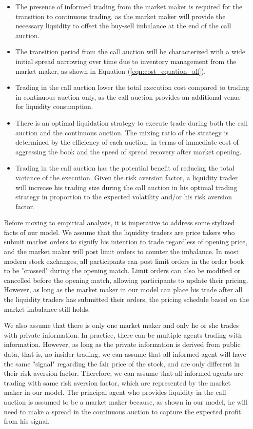 \begin{itemize}
  \item The presence of informed trading from the market maker is required for the transition to continuous trading, as the market maker will provide the necessary liquidity to offset the buy-sell imbalance at the end of the call auction.
  \item The transition period from the call auction will be characterized with a wide initial spread narrowing over time due to inventory management from the market maker, as shown in Equation (\ref{eqn:cost_equation_all}).
  \item Trading in the call auction lower the total execution cost compared to trading in continuous auction only, as the call auction provides an additional venue for liquidity consumption.
  \item There is an optimal liquidation strategy to execute trade during both the call auction and the continuous auction. The mixing ratio of the strategy is determined by the efficiency of each auction, in terms of immediate cost of aggressing the book and the speed of spread recovery after market opening.
  \item Trading in the call auction has the potential benefit of reducing the total variance of the execution. Given the risk aversion factor, a liquidity trader will increase his trading size during the call auction in his optimal trading strategy in proportion to the expected volatility and/or his risk aversion factor.
\end{itemize}

Before moving to empirical analysis, it is imperative to address some stylized facts of our model. We assume that the liquidity traders are price takers who submit market orders to signify his intention to trade regardless of opening price, and the market maker will post limit orders to counter the imbalance. In most modern stock exchanges, all participants can post limit orders in the order book to be "crossed" during the opening match. Limit orders can also be modified or cancelled before the opening match, allowing participants to update their pricing. However, as long as the market maker in our model can place his trade after all the liquidity traders has submitted their orders, the pricing schedule based on the market imbalance still holds.

We also assume that there is only one market maker and only he or she trades with private information. In practice, there can be multiple agents trading with information. However, as long as the private information is derived from public data, that is, no insider trading, we can assume that all informed agent will have the same "signal" regarding the fair price of the stock, and are only different in their risk aversion factor. Therefore, we can assume that all informed agents are trading with same risk aversion factor, which are represented by the market maker in our model. The principal agent who provides liquidity in the call auction is assumed to be a market maker because, as shown in our model, he will need to make a spread in the continuous auction to capture the expected profit from his signal.


